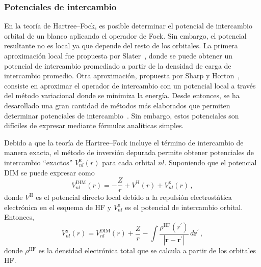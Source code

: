 \subsubsection*{Potenciales de intercambio}

En la teoría de Hartree--Fock, es posible determinar el potencial de 
intercambio orbital de un blanco aplicando el operador de Fock. Sin 
embargo, el potencial resultante no es local ya que depende del resto de 
los orbitales. La primera aproximación local fue propuesta por 
Slater~\cite{Slater:51}, donde se puede obtener un potencial de 
intercambio promediado a partir de la densidad de carga de intercambio 
promedio. Otra aproximación, propuesta por Sharp y 
Horton~\cite{Sharp:53}, consiste en aproximar el operador de intercambio 
con un potencial local a través del método variacional donde se minimiza 
la energía. Desde entonces, se ha desarollado una gran cantidad de 
métodos más elaborados que permiten determinar potenciales de 
intercambio~\cite{Krieger:92,Gorling:92,Yang:02,Staroverov:06,
Ryabinkin:13}. Sin embargo, estos potenciales son difíciles de expresar 
mediante fórmulas analíticas simples.

Debido a que la teoría de Hartree--Fock incluye el término de 
intercambio de manera exacta, el método de inversión depurada 
permite obtener potenciales de intercambio ``exactos'' 
$V_{nl}^{\mathrm{x}}(r)$ para cada orbital $nl$. Suponiendo que el 
potencial DIM se puede expresar como
\begin{equation}
V_{nl}^{\mathrm{DIM}}(r) = -\frac{Z}{r} + V^{\mathrm{H}}(r) 
+ V_{nl}^{\mathrm{x}}(r) \, , 
\label{eq:VDIM}
\end{equation}
donde $V^{\mathrm{H}}$ es el potencial directo local debido a la 
repulsión electrostática electrónica en el esquema de HF y 
$V_{nl}^{\mathrm{x}}$ es el potencial de intercambio orbital. Entonces,
\begin{equation}
V_{nl}^{\mathrm{x}}(r)=V_{nl}^{\mathrm{DIM}}(r)+\frac{Z}{r}
-\int{ \frac{\rho^{\mathrm{HF}}(r^{\prime})  }
{\left| \mathbf{r} - \mathbf{r^{\prime}} \right|}} \, 
d \mathbf{r^{\prime}} \, ,
\label{eq:exchange-potential}
\end{equation}
donde $\rho^{\mathrm{HF}}$ es la densidad electrónica total que se
calcula a partir de los orbitales HF.

